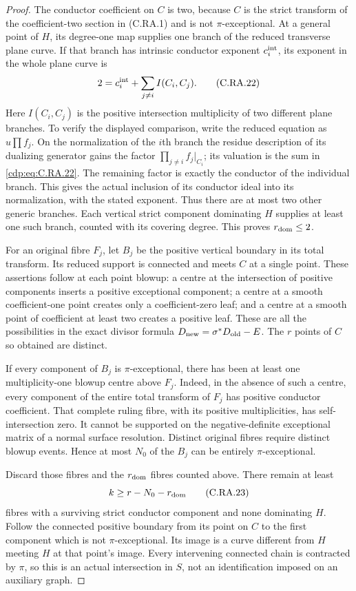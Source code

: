 \begin{proof}
The conductor coefficient on $C$ is two, because $C$ is
the strict transform of the coefficient-two section in
(C.RA.1) and is not $\pi$-exceptional. At a general point
of $H$, its degree-one map supplies one branch of the reduced
transverse plane curve. If that branch has intrinsic
conductor exponent $c_i^{\rm int}$, its exponent in the
whole plane curve is
\[
             2=c_i^{\rm int}+\sum_{j\ne i}I(C_i,C_j).
\tag{C.RA.22}\label{cdp:eq:C.RA.22}
\]
Here $I(C_i,C_j)$ is the positive intersection multiplicity
of two different plane branches. To verify the displayed
comparison, write the reduced equation as $u\prod f_j$.
On the normalization of the $i$th branch the residue
description of its dualizing generator gains the factor
$\prod_{j\ne i}f_j|_{C_i}$; its valuation is the sum in
\eqref{cdp:eq:C.RA.22}. The remaining factor is exactly the conductor
of the individual branch. This gives the actual inclusion
of its conductor ideal into its normalization, with the
stated exponent. Thus there are at most two other generic
branches. Each vertical strict component dominating $H$
supplies at least one such branch, counted with its covering
degree. This proves $r_{\rm dom}\le2$.

For an original fibre $F_j$, let $B_j$ be the positive
vertical boundary in its total transform. Its reduced
support is connected and meets $C$ at a single point.
These assertions follow at each point blowup: a centre
at the intersection of positive components inserts a
positive exceptional component; a centre at a smooth
coefficient-one point creates only a coefficient-zero
leaf; and a centre at a smooth point of coefficient
at least two creates a positive leaf. These are all the
possibilities in the exact divisor formula
$D_{\rm new}=\sigma^*D_{\rm old}-E$.
The $r$ points of $C$ so obtained are distinct.

If every component of $B_j$ is $\pi$-exceptional, there
has been at least one multiplicity-one blowup centre
above $F_j$. Indeed, in the absence of such a centre,
every component of the entire total transform of $F_j$
has positive conductor coefficient. That complete
ruling fibre, with its positive multiplicities, has
self-intersection zero. It cannot be supported on the
negative-definite exceptional matrix of a normal surface
resolution. Distinct original fibres require distinct
blowup events. Hence at most $N_0$ of the $B_j$ can be
entirely $\pi$-exceptional.

Discard those fibres and the $r_{\rm dom}$ fibres counted
above. There remain at least
\[
                        k\ge r-N_0-r_{\rm dom}
\tag{C.RA.23}\label{cdp:eq:C.RA.23}
\]
fibres with a surviving strict conductor component and
none dominating $H$. Follow the connected positive
boundary from its point on $C$ to the first component
which is not $\pi$-exceptional. Its image is a curve
different from $H$ meeting $H$ at that point's image.
Every intervening connected chain is contracted by
$\pi$, so this is an actual intersection in $S$, not
an identification imposed on an auxiliary graph.


\end{proof}
